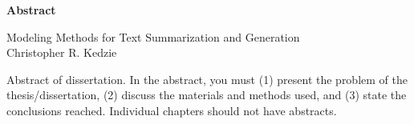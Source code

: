 
\begin{titlepage}
\begin{center}

\vspace*{5\baselineskip}
\textbf{\large Abstract}

Modeling Methods for Text Summarization and Generation\\

Christopher R. Kedzie
\end{center}
\begin{flushleft}
\hspace{10mm}Abstract of dissertation. In the abstract, you must (1) present the problem of the thesis/dissertation, (2) discuss the materials and methods used, and (3) state the conclusions reached. Individual chapters should not have abstracts.


\end{flushleft}
\vspace*{\fill}
\end{titlepage}
